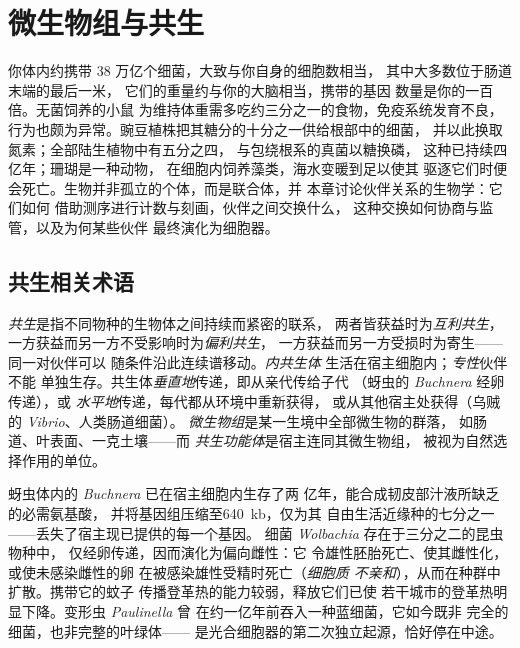 \chapter{微生物组与共生}\label{ch:b3:microbiomes}

你体内约携带 38 万亿个细菌，大致与你自身的细胞数相当，
其中大多数位于肠道末端的最后一米，
它们的重量约与你的大脑相当，携带的基因
数量是你的一百倍。无菌饲养的小鼠
为维持体重需多吃约三分之一的食物，免疫系统发育不良，
行为也颇为异常。豌豆植株把其糖分的十分之一供给根部中的细菌，
并以此换取氮素；全部陆生植物中有五分之四，
与包绕根系的真菌以糖换磷，
这种已持续四亿年；珊瑚是一种动物，
在细胞内饲养藻类，海水变暖到足以使其
驱逐它们时便会死亡。生物并非孤立的个体，而是联合体，并
本章讨论伙伴关系的生物学：它们如何
借助测序进行计数与刻画，伙伴之间交换什么，
这种交换如何协商与监管，以及为何某些伙伴
最终演化为细胞器。

\section{共生相关术语}

\begin{definition}[共生]\label{def:b3:microbiomes:symbiosis}
\emph{共生}是指不同物种的生物体之间持续而紧密的联系，
两者皆获益时为\emph{互利共生}，
一方获益而另一方不受影响时为\emph{偏利共生}，
一方获益而另一方受损时为寄生——同一对伙伴可以
随条件沿此连续谱移动。\emph{内共生体}
生活在宿主细胞内；\emph{专性}伙伴不能
单独生存。共生体\emph{垂直地}传递，即从亲代传给子代
（蚜虫的 \emph{Buchnera} 经卵传递），或
\emph{水平地}传递，每代都从环境中重新获得，
或从其他宿主处获得（乌贼的 \emph{Vibrio}、人类肠道细菌）。
\emph{微生物组}是某一生境中全部微生物的群落，
如肠道、叶表面、一克土壤——而
\emph{共生功能体}是宿主连同其微生物组，
被视为自然选择作用的单位。
\end{definition}

\begin{example}[三种专性伙伴]\label{ex:b3:microbiomes:obligate}
蚜虫体内的 \emph{Buchnera} 已在宿主细胞内生存了两
亿年，能合成韧皮部汁液所缺乏的必需氨基酸，
并将基因组压缩至\qty{640}{kb}，仅为其
自由生活近缘种的七分之一——丢失了宿主现已提供的每一个基因。
细菌 \emph{Wolbachia} 存在于三分之二的昆虫物种中，
仅经卵传递，因而演化为偏向雌性：它
令雄性胚胎死亡、使其雌性化，或使未感染雌性的卵
在被感染雄性受精时死亡（\emph{细胞质
不亲和}），从而在种群中扩散。携带它的蚊子
传播登革热的能力较弱，释放它们已使
若干城市的登革热明显下降。变形虫 \emph{Paulinella} 曾
在约一亿年前吞入一种蓝细菌，它如今既非
完全的细菌，也非完整的叶绿体——
是光合细胞器的第二次独立起源，恰好停在中途。
\end{example}

